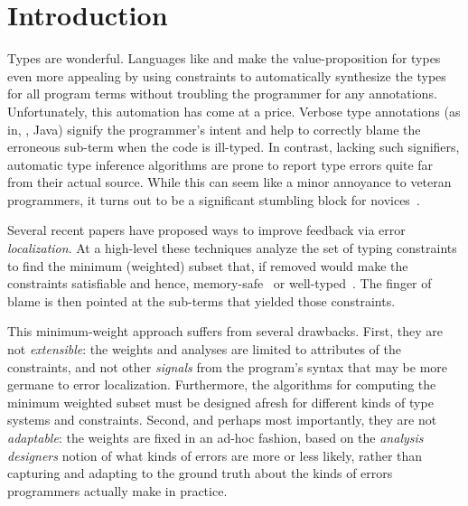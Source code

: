 \section{Introduction}
\label{sec:introduction}

%
Types are wonderful.
%
Languages like \ocaml and \haskell make
the value-proposition for types even more
appealing by using constraints to automatically
synthesize the types for all program terms
without troubling the programmer for any
annotations.
%
Unfortunately, this automation has come at a price.
Verbose type annotations (as in, \eg, Java) signify
the programmer's intent and help to correctly
blame the erroneous sub-term when the code is
ill-typed.
%
In contrast, lacking such signifiers, automatic
type inference algorithms are prone to report
type errors quite far from their actual source.
%
While this can seem like a minor annoyance to
veteran programmers, it turns out to be a significant
stumbling block for novices~\citep{Wand1986-nw,Joosten1993-yx}.

%
Several recent papers have proposed ways
to improve feedback via error \emph{localization}.
%
At a high-level these techniques analyze
the set of typing constraints to find
the minimum (weighted) subset that,
if removed would make the constraints
satisfiable and hence, memory-safe~\citep{Jose:2011}
or well-typed~\citep{Zhang2014-lv,Loncaric2016-uk,Chen2014-vm,Pavlinovic2014-mr}.
The finger of blame is then pointed at the
sub-terms that yielded those constraints.

This minimum-weight approach suffers
from several drawbacks.
%
First, they are not \emph{extensible}:
the weights and analyses are limited
to attributes of the constraints, and
not other \emph{signals} from the
program's syntax that may be more
germane to error localization. Furthermore,
the algorithms for computing
the minimum weighted subset must be
designed afresh for different kinds
of type systems and constraints.
%
Second, and perhaps most importantly,
they are not \emph{adaptable}: the
weights are fixed in an ad-hoc fashion, based on the
\emph{analysis designers} notion
of what kinds of errors are more
or less likely, rather than
capturing and adapting to the
ground truth about the kinds
of errors programmers actually
make in practice.

